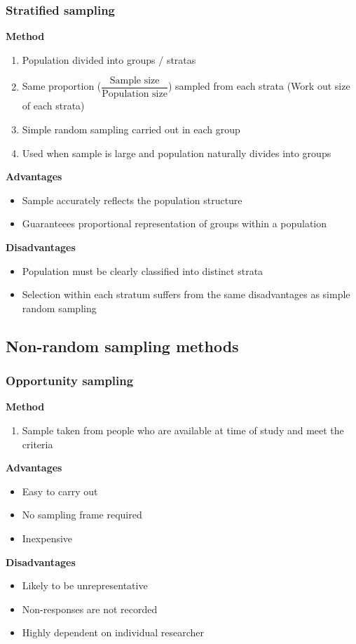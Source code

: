 \documentclass[A4paper]{article}
\begin{document}
	\subsubsection{Stratified sampling}
	\textbf{Method}
	\begin{enumerate}
		\item Population divided into groups / stratas
		\item Same proportion ($\dfrac{\text{Sample size}}{\text{Population size}}$) sampled from each strata (Work out size of each strata)
		\item Simple random sampling carried out in each group
		\item Used when sample is large and population naturally divides into groups
	\end{enumerate}
	\textbf{Advantages}
	\begin{itemize}
		\item Sample accurately reflects the population structure
		\item Guaranteees proportional representation of groups within a population
	\end{itemize}
	\textbf{Disadvantages}
	\begin{itemize}
		\item Population must be clearly classified into distinct strata
		\item Selection within each stratum suffers from the same disadvantages as simple random sampling
	\end{itemize}
	\subsection{Non-random sampling methods}
	\subsubsection{Opportunity sampling}
	\textbf{Method}
	\begin{enumerate}
		\item Sample taken from people who are available at time of study and meet the criteria
	\end{enumerate}
	\textbf{Advantages}
	\begin{itemize}
		\item Easy to carry out
		\item No sampling frame required
		\item Inexpensive
	\end{itemize}
	\textbf{Disadvantages}
	\begin{itemize}
		\item Likely to be unrepresentative
		\item Non-responses are not recorded
		\item Highly dependent on individual researcher
	\end{itemize}
	
\end{document}

